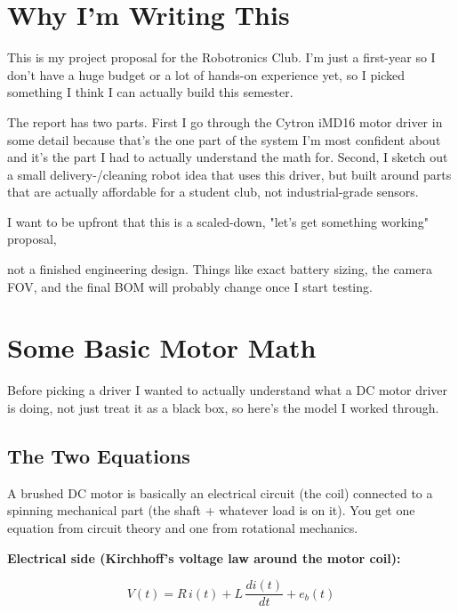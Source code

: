 \documentclass[12pt,a4paper]{article}
\begin{document}
\section{Why I'm Writing This}

This is my project proposal for the Robotronics Club. I'm  just a first-year so I don't have a
huge budget or a lot of hands-on experience yet, so I picked something I think I can actually
build this semester.

The report has two parts. First I go through the Cytron iMD16 motor driver in some detail
because that's the one part of the system I'm most confident about and it's the part I had
to actually understand the math for. Second, I sketch out a small delivery-/cleaning robot idea that
uses this driver, but built around parts that are actually affordable for a student club,
not industrial-grade sensors.

I want to be upfront that this is a scaled-down, "let's get something working" proposal,

not a finished engineering design. Things like exact battery sizing, the camera FOV, and
the final BOM will probably change once I start testing.

\section{Some Basic Motor Math}

Before picking a driver I wanted to actually understand what a DC motor driver is doing,
not just treat it as a black box, so here's the model I worked through.

\subsection{The Two Equations}

A brushed DC motor is basically an electrical circuit (the coil) connected to a spinning
mechanical part (the shaft + whatever load is on it). You get one equation from circuit
theory and one from rotational mechanics.

\textbf{Electrical side (Kirchhoff's voltage law around the motor coil):}

\begin{equation}
    V(t) = R\,i(t) + L\,\frac{di(t)}{dt} + e_b(t)
    \label{eq:kvl}
\end{equation}
\end{document}
